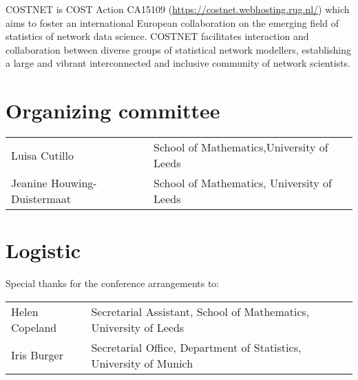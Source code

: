 COSTNET is COST Action CA15109 (\url{https://costnet.webhosting.rug.nl/}) which aims to foster an international European collaboration on the emerging field of statistics of network data science. COSTNET facilitates interaction and collaboration between diverse groups of statistical network modellers, establishing a large and vibrant interconnected and inclusive community of network scientists. 



\section{Organizing committee}
\begin{center}
\begin{tabular}{ll}
Luisa Cutillo & School of Mathematics,University of Leeds\\
Jeanine Houwing-Duistermaat & School of Mathematics, University of Leeds


\end{tabular}
\end{center}
\section{Logistic}
Special thanks for the conference arrangements to:
\begin{center}
\begin{tabular}{ll}
Helen Copeland & Secretarial Assistant, School of Mathematics, University of Leeds\\
Iris Burger & Secretarial Office, Department of Statistics, University of Munich\\ 

\end{tabular}
\end{center}

